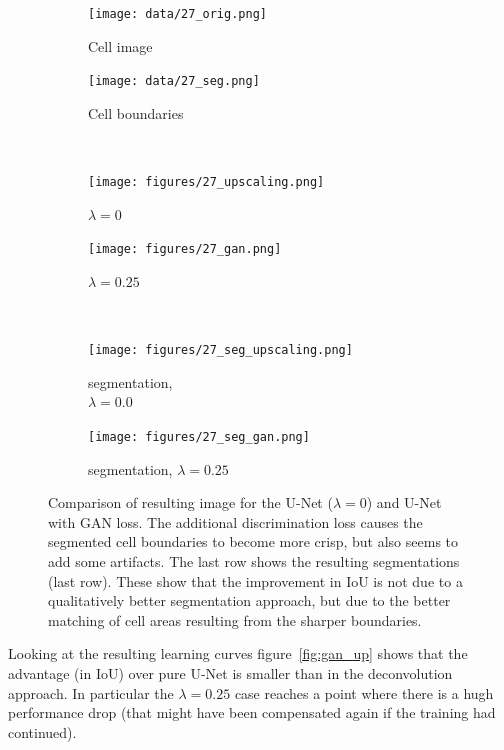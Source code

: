 \documentclass[aps,prl,twocolumn,groupedaddress,amsmath,amssymb]{revtex4-1}
\begin{document}
    \begin{figure}[tbp]
        \begin{subfigure}[c]{0.45\linewidth}
            \texttt{[image: data/27\_orig.png]}
            \caption{Cell image}
        \end{subfigure} %
        \begin{subfigure}[c]{0.45\linewidth}
            \texttt{[image: data/27\_seg.png]}
            \caption{Cell boundaries}
        \end{subfigure} \\
        \begin{subfigure}[c]{0.45\linewidth}
            \texttt{[image: figures/27\_upscaling.png]}
            \caption{$\lambda=0$}
        \end{subfigure}%
        \begin{subfigure}[c]{0.45\linewidth}
            \texttt{[image: figures/27\_gan.png]}
            \caption{$\lambda=0.25$}
        \end{subfigure}\\
        \begin{subfigure}[c]{0.45\linewidth}
            \texttt{[image: figures/27\_seg\_upscaling.png]}
            \caption{segmentation, \\ $\lambda=0.0$}
        \end{subfigure}%
        \begin{subfigure}[c]{0.45\linewidth}
            \texttt{[image: figures/27\_seg\_gan.png]}
            \caption{segmentation, $\lambda=0.25$}
        \end{subfigure}
        \caption{Comparison of resulting image for the U-Net ($\lambda=0$) and U-Net with GAN loss.
         The additional discrimination loss causes the segmented cell boundaries
        to become more crisp, but also seems to add some artifacts.
        The last row shows the resulting segmentations (last row). These show that the improvement 
        in IoU is not due to a qualitatively better segmentation approach, but due to the better 
        matching of cell areas resulting from the sharper boundaries.}
        \label{fig:unet_vs_ganunet}
    \end{figure}

    Looking at the resulting learning curves figure~\ref{fig:gan_up} shows that the advantage 
    (in IoU) over pure U-Net is smaller than in the deconvolution approach. In particular the 
    $\lambda=0.25$ case reaches a point where there is a hugh performance drop (that might have been
    compensated again if the training had continued).
\end{document}
